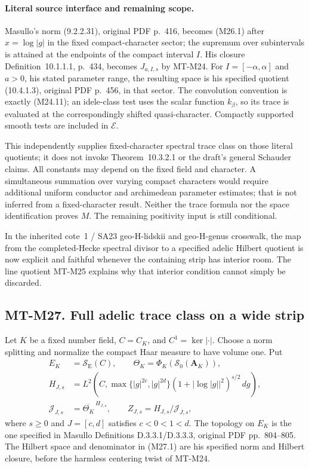 \paragraph{Literal source interface and remaining scope.}
Masullo's norm (9.2.2.31), original PDF p.~416, becomes
(M26.1) after $x=\log|g|$ in the fixed compact-character
sector; the supremum over subintervals is attained at
the endpoints of the compact interval $I$. His closure
Definition~10.1.1.1, p.~434, becomes $J_{a,I,s}$ by
MT-M24. For $I=[-\alpha,\alpha]$ and $a>0$, his stated
parameter range, the resulting space
is his specified quotient (10.4.1.3), original PDF p.~456,
in that sector. The convolution convention is exactly
(M24.11); an idele-class test uses the scalar function
$k_\beta$, so its trace is evaluated at the correspondingly
shifted quasi-character. Compactly supported smooth tests
are included in $\mathcal E$.

This independently supplies fixed-character spectral
trace class on those literal quotients; it does not invoke
Theorem~10.3.2.1 or the draft's general Schauder claims.
All constants may depend on the fixed field and character.
A simultaneous summation over varying compact characters
would require additional uniform conductor and archimedean
parameter estimates; that is not inferred from a
fixed-character result. Neither the trace formula nor
the space identification proves $M$. The remaining
positivity input is still conditional.

In the inherited cote~1 / SA23 geo-H-lidskii and geo-H-genus
crosswalk, the map from the completed-Hecke spectral
divisor to a specified adelic Hilbert quotient is now
explicit and faithful whenever the containing strip has
interior room. The line quotient MT-M25 explains why
that interior condition cannot simply be discarded.

\subsection*{MT-M27. Full adelic trace class on a wide strip}
Let $K$ be a fixed number field, $C=C_K$, and
$C^1=\ker|\cdot|$. Choose a norm splitting and normalize
the compact Haar measure to have volume one. Put
\[
 \begin{split}
 E_K&=\mathcal S_{\mathrm E}(C),\qquad
 \Theta_K=\Phi_K(\mathcal S_0(\mathbf A_K)),\\
 H_{J,s}&=L^2\!\left(C,
       \max\{|g|^{2c},|g|^{2d}\}
       (1+|\log|g||^2)^{s/2}\,dg\right),\\
 \mathcal J_{J,s}&=\overline{\Theta_K}^{\,H_{J,s}},
 \qquad Z_{J,s}=H_{J,s}/\mathcal J_{J,s},
 \end{split}                                                    \tag{M27.1}
\]
where $s\ge0$ and $J=[c,d]$ satisfies $c<0<1<d$.
The topology on $E_K$ is the one specified in Masullo
Definitions D.3.3.1/D.3.3.3, original PDF pp.~804--805.
The Hilbert space and denominator in (M27.1) are his
specified norm and Hilbert closure, before the harmless
centering twist of MT-M24.


